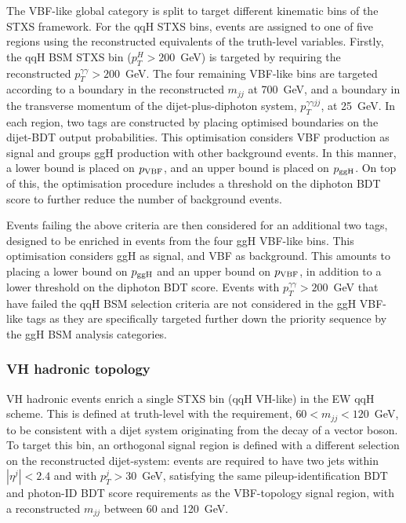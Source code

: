 The VBF-like global category is split to target different kinematic bins of the STXS framework. For the qqH STXS bins, events are assigned to one of five regions using the reconstructed equivalents of the truth-level variables. Firstly, the qqH BSM STXS bin ($p_T^H>200$~GeV) is targeted by requiring the reconstructed $p_T^{\gamma\gamma}>200$~GeV. The four remaining VBF-like bins are targeted according to a boundary in the reconstructed $m_{jj}$ at 700~GeV, and a boundary in the transverse momentum of the dijet-plus-diphoton system, $p_T^{\gamma\gamma jj}$, at 25~GeV. In each region, two tags are constructed by placing optimised boundaries on the dijet-BDT output probabilities. This optimisation considers VBF production as signal and groups ggH production with other background events. In this manner, a lower bound is placed on $p_{\rm{VBF}}$, and an upper bound is placed on $p_{\rm{ggH}}$. On top of this, the optimisation procedure includes a threshold on the diphoton BDT score to further reduce the number of background events.

Events failing the above criteria are then considered for an additional two tags, designed to be enriched in events from the four ggH VBF-like bins. This optimisation considers ggH as signal, and VBF as background. This amounts to placing a lower bound on $p_{\rm{ggH}}$ and an upper bound on $p_{\rm{VBF}}$, in addition to a lower threshold on the diphoton BDT score. Events with $p_T^{\gamma\gamma}>200$~GeV that have failed the qqH BSM selection criteria are not considered in the ggH VBF-like tags as they are specifically targeted further down the priority sequence by the ggH BSM analysis categories.

\subsubsection{VH hadronic topology}
VH hadronic events enrich a single STXS bin (qqH VH-like) in the EW qqH scheme. This is defined at truth-level with the requirement, $60<m_{jj}<120$~GeV, to be consistent with a dijet system originating from the decay of a vector boson. To target this bin, an orthogonal signal region is defined with a different selection on the reconstructed dijet-system: events are required to have two jets within $|\eta^j|<2.4$ and with $p_T^j>30$~GeV, satisfying the same pileup-identification BDT and photon-ID BDT score requirements as the VBF-topology signal region, with a reconstructed $m_{jj}$ between 60 and 120~GeV. 

